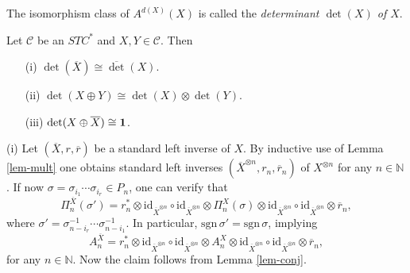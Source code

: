\documentclass[12pt]{article}
\theoremstyle{definition}
\theoremstyle{definition}
\theoremstyle{remark}
\def\2#1{{\mathcal #1}}
\def\7#1{{\mathbb #1}}
\def\1#1{{\bf #1}}
\def\ol#1{{\overline #1}}
\newcommand{\mcirc}{\circ}
\def\id{\mathrm{id}}
\begin{document}
\bdefin {}
The isomorphism class of $A^{d(X)}(X)$ is called the {\it determinant $\det(X)$ of $X$}. 
\edefin

\blemma \label{l-dets}
Let $\2C$ be an $STC^*$ and $X,Y\in\2C$. Then 
\begin{itemize}
\item[(i)] $\det(\ol{X})\cong \ol{\det(X)}$.
\item[(ii)] $\det(X\oplus Y)\cong \det(X)\otimes \det(Y)$.
\item[(iii)] $\det(X\oplus \ol{X})\cong\11$.
\end{itemize}
\elemma

\prf (i) Let $(\ol{X},r,\ol{r})$ be a standard left inverse of $X$. By inductive use of Lemma
\ref{lem-mult} one obtains standard left inverses $(\ol{X}^{\otimes n},r_n,\ol{r}_n)$ of
$X^{\otimes n}$ for any $n\in\7N$. If now $\sigma=\sigma_{i_1}\cdots\sigma_{i_r}\in P_n$, one can
verify that
\[ \Pi_n^{\ol{X}}(\sigma')=r_n^*\otimes\id_{\ol{X}^{\otimes n}}
  \mcirc\id_{\ol{X}^{\otimes n}}\otimes\Pi_n^X(\sigma)\otimes\id_{\ol{X}^{\otimes n}}
  \mcirc\id_{\ol{X}^{\otimes n}}\otimes\ol{r}_n, \]
where $\sigma'=\sigma_{n-i_r}^{-1}\cdots\sigma_{n-i_1}^{-1}$. In particular,
$\mathrm{sgn}\,\sigma'=\mathrm{sgn}\,\sigma$, implying
\[ A_n^{\ol{X}}=r_n^*\otimes\id_{\ol{X}^{\otimes n}}
  \mcirc\id_{\ol{X}^{\otimes n}}\otimes A_n^X\otimes\id_{\ol{X}^{\otimes n}}
  \mcirc\id_{\ol{X}^{\otimes n}}\otimes\ol{r}_n, \]
for any $n\in\7N$. Now the claim follows from Lemma \ref{lem-conj}.
\end{document}
